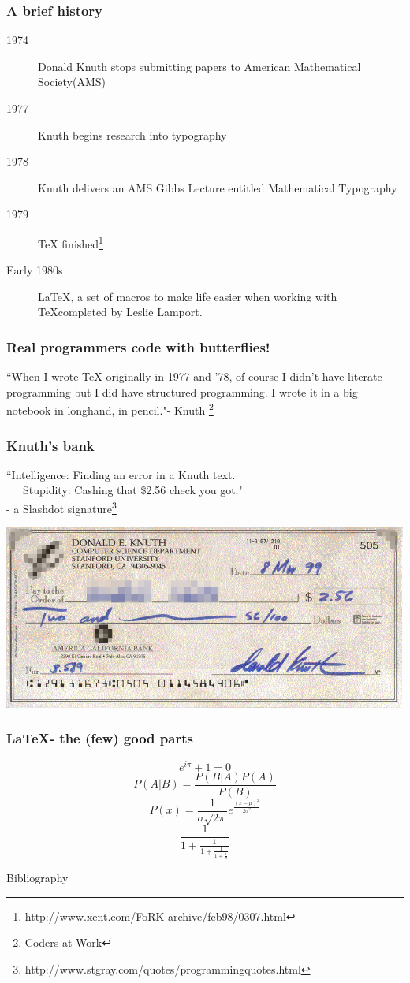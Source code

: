 \begin{frame}
	\frametitle{A brief history}
	\begin{description}
		\item[1974] Donald Knuth stops submitting papers to American Mathematical Society(AMS)
		\item[1977] Knuth begins research into typography
		\item[1978] Knuth delivers an AMS Gibbs Lecture entitled Mathematical 
Typography
		\item[1979] \TeX 
finished\footnote{\url{http://www.xent.com/FoRK-archive/feb98/0307.html}}
		\item[Early 1980s] \LaTeX, a set of macros to make life easier when working with \TeX completed by Leslie Lamport. 
	\end{description}
\end{frame}
\begin{frame}
	\frametitle{Real programmers code with butterflies!}
	``When I wrote TeX originally in 1977 and ’78, of course I didn’t have literate programming but I did have structured programming. I wrote it in a big notebook in longhand, in pencil."- Knuth \footnote{Coders at Work}
\end{frame}
\begin{frame}
	\frametitle{Knuth's bank}
``Intelligence: Finding an error in a Knuth text.\\
~~~Stupidity: Cashing that \$2.56 check you got." \\- a Slashdot signature\footnote{http://www.stgray.com/quotes/programmingquotes.html}

\begin{center}
	\includegraphics[scale=0.3]{hexadollar.png}
\end{center}

\end{frame}
\begin{frame}[allowframebreaks]
	\frametitle{\LaTeX - the (few) good parts}
	\huge
	\[e^{i\pi} + 1 = 0\]
	\framebreak
\[P(A|B) = \frac{P(B|A)P(A)}{P(B)}\]
\framebreak
\[
	P(x) = \frac{1}{{\sigma \sqrt {2\pi } }}e^{\frac{(x-\mu)^2}{2\sigma^2}}
\]
\framebreak
\[
	\frac{1}{\displaystyle 1+  \frac{1}{\displaystyle 1+ \frac{1}{\displaystyle 1+ \frac{1}{\pi}}}}
\]
\framebreak
\begin{center}
	Bibliography
\end{center}
\end{frame}
